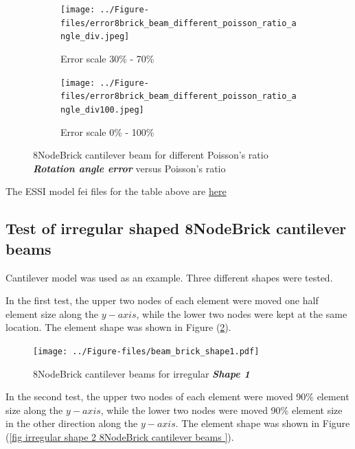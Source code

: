 \documentclass[fleqn,11pt]{article}
\begin{document}
\begin{figure}[H]
  \begin{subfigure}{0.5\textwidth}
    \centering
    \texttt{[image: ../Figure-files/error8brick\_beam\_different\_poisson\_ratio\_angle\_div.jpeg]}
    \caption{Error scale 30\% - 70\%}
  \end{subfigure}
  \begin{subfigure}{0.5\textwidth}
    \centering
    \texttt{[image: ../Figure-files/error8brick\_beam\_different\_poisson\_ratio\_angle\_div100.jpeg]}
    \caption{Error scale 0\% - 100\%}
  \end{subfigure}
  \captionsetup{justification=centering,margin=3cm}
  \caption{8NodeBrick cantilever beam for different Poisson's ratio\\
      \emph{\textbf{Rotation angle error}}   versus   Poisson's ratio}
  \label{table angle error 8NodeBrick cantilever beam for different Poisson ratio}
\end{figure}



The ESSI model fei files for the table above are \href{https://github.com/yuan-energy/ESSI_Verification/blob/master/8NodeBrick/cantilever_different_Poisson/cantilever_different_Poisson.tar.gz?raw=true}{here}




\newpage
\subsection{Test of irregular shaped 8NodeBrick cantilever beams}

Cantilever model was used as an example. 
Three different shapes were tested. 


In the first test, the upper two nodes of each element were moved one half element size along the $y-axis$, while the lower two nodes were kept at the same location. The element shape was shown in Figure (\ref{fig irregular shape 1 8NodeBrick cantilever beams }).

\begin{figure}[H]
  \centering
  \texttt{[image: ../Figure-files/beam\_brick\_shape1.pdf]}
  \caption{8NodeBrick cantilever beams for irregular \textbf{\emph{Shape 1}} }
  \label{fig irregular shape 1 8NodeBrick cantilever beams }
\end{figure}


In the second test, the upper two nodes of each element were moved 90\% element size along the $y-axis$, while the lower two nodes were moved 90\% element size in the other direction along the $y-axis$. The element shape was shown in Figure (\ref{fig irregular shape 2 8NodeBrick cantilever beams }).
\end{document}
